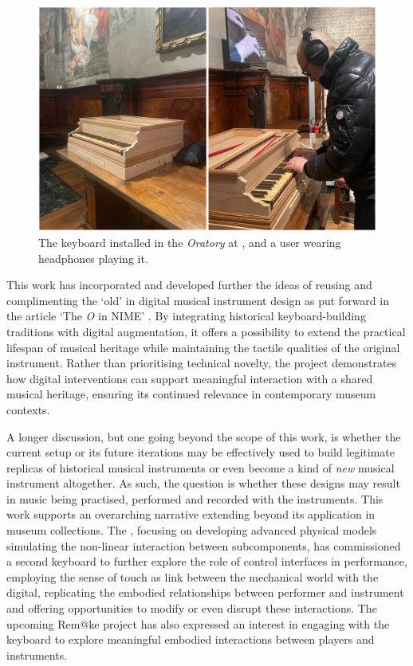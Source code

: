 \begin{figure}
\centering
\includegraphics[width = \linewidth]{src/images/keyboardMuseum.JPEG}
\caption{The keyboard installed in the \emph{Oratory} at , and a user wearing headphones playing it.}
\label{fig:oratory}
\end{figure}

This work has incorporated and developed further the ideas of reusing and complimenting the `old' in digital musical instrument design as put forward in the article `The \emph{O} in NIME' \cite{Masu_NIME_2023}. By integrating historical keyboard-building traditions with digital augmentation, it offers a possibility to extend the practical lifespan of musical heritage while maintaining the tactile qualities of the original instrument. Rather than prioritising technical novelty, the project demonstrates how digital interventions can support meaningful interaction with a shared musical heritage, ensuring its continued relevance in contemporary museum contexts.

A longer discussion, but one going beyond the scope of this work, is whether the current setup or its future iterations may be effectively used to build legitimate replicas of historical musical instruments or even become a kind of \emph{new} musical instrument altogether. As such, the question is whether these designs may result in music being practised, performed and recorded with the instruments. This work supports an overarching narrative extending beyond its application in museum collections. The , focusing on developing advanced physical models simulating the non-linear interaction between subcomponents, has commissioned a second keyboard to further explore the role of control interfaces in performance, employing the sense of touch as link between the mechanical world with the digital, replicating the embodied relationships between performer and instrument and offering opportunities to modify or even disrupt these interactions. The upcoming Rem@ke project \cite{remake1} has also expressed an interest in engaging with the keyboard to explore meaningful embodied interactions between players and instruments. 

